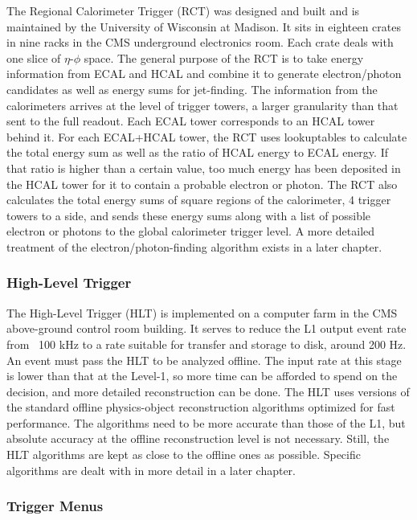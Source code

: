 The Regional Calorimeter Trigger (RCT) was designed and built and is maintained 
by the University of Wisconsin at Madison.  
It sits in eighteen crates in nine racks in the CMS underground electronics room.  
Each crate deals with one slice of $\eta$-$\phi$ space.  
The general purpose of the RCT is to take 
energy information from ECAL and HCAL and combine it 
to generate electron/photon candidates as well as energy sums for 
jet-finding.  
The information from the calorimeters arrives at the level of trigger towers, 
a larger granularity than that sent to the full readout.  
Each ECAL tower corresponds to an HCAL tower behind it.  
For each ECAL+HCAL tower, the RCT uses lookuptables to 
calculate the total energy sum 
as well as the ratio of HCAL energy to ECAL energy.  
If that ratio is higher than a certain value, 
too much energy has been deposited in the HCAL tower for it to 
contain a probable electron or photon.  
The RCT also calculates the total energy sums 
of square regions of the calorimeter, 
4 trigger towers to a side, 
and sends these energy sums along with a list of possible 
electron or photons to the global calorimeter trigger level.  
A more detailed treatment of the electron/photon-finding 
algorithm exists in a later chapter.  

\subsubsection{High-Level Trigger}

The High-Level Trigger (HLT) is implemented on a computer farm in the 
CMS above-ground control room building.  
It serves to reduce the L1 output event rate from ~100 kHz to a rate suitable 
for transfer and storage to disk, around 200 Hz.  
An event must pass the HLT to be analyzed offline.  
The input rate at this stage is lower than that at the Level-1, 
so more time can be afforded to spend on the decision, 
and more detailed reconstruction can be done.  
The HLT uses versions of the standard offline physics-object reconstruction algorithms 
optimized for fast performance.  
The algorithms need to be more accurate than those of the L1, 
but absolute accuracy at the offline reconstruction level is not necessary.  
Still, the HLT algorithms are kept as close to the offline ones as possible.  
Specific algorithms are dealt with in more detail in a later chapter.  

\subsubsection{Trigger Menus}

